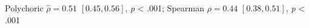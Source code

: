 Polychoric $\hat{\rho}=0.51$ \([0.45, 0.56]\), \textit{p} < .001; Spearman $\rho=0.44$ \([0.38, 0.51]\), \textit{p} < .001%
